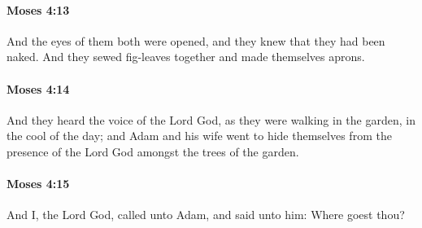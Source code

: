 		\paragraph{Moses 4:13} %
			\label{MOSES-4-13}

			And the eyes of them both were opened, and they knew that they had been naked. And they sewed fig-leaves together and made themselves aprons.


		\paragraph{Moses 4:14} %
			\label{MOSES-4-14}

			And they heard the voice of the Lord God, as they were walking in the garden, in the cool of the day; and Adam and his wife went to hide themselves from the presence of the Lord God amongst the trees of the garden.


		\paragraph{Moses 4:15} %
			\label{MOSES-4-15}

			And I, the Lord God, called unto Adam, and said unto him: Where goest thou?


